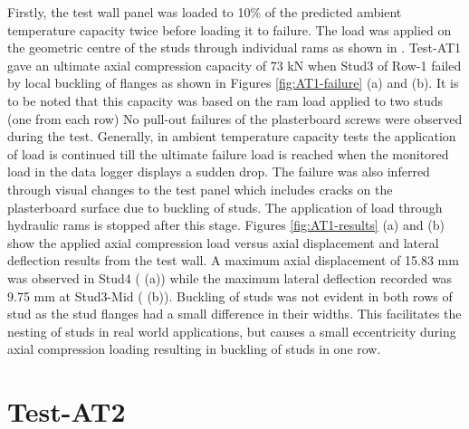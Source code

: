 Firstly, the test wall panel was loaded to 10\% of the predicted ambient temperature capacity twice before loading it to failure. The load was applied on the geometric centre of the studs through individual rams as shown in . Test-AT1 gave an ultimate axial compression capacity of 73 kN when Stud3 of Row-1 failed by local buckling of flanges as shown in Figures \ref{fig:AT1-failure} (a) and (b). It is to be noted that this capacity was based on the ram load applied to two studs (one from each row) No pull-out failures of the plasterboard screws were observed during the test. Generally, in ambient temperature capacity tests the application of load is continued till the ultimate failure load is reached when the monitored load in the data logger displays a sudden drop. The failure was also inferred through visual changes to the test panel which includes cracks on the plasterboard surface due to buckling of studs. The application of load through hydraulic rams is stopped after this stage. Figures \ref{fig:AT1-results} (a) and (b) show the applied axial compression load versus axial displacement and lateral deflection results from the test wall. A maximum axial displacement of 15.83 mm was observed in Stud4 ( (a)) while the maximum lateral deflection recorded was 9.75 mm at Stud3-Mid ( (b)). Buckling of studs was not evident in both rows of stud as the stud flanges had a small difference in their widths. This facilitates the nesting of studs in real world applications, but causes a small eccentricity during axial compression loading resulting in buckling of studs in one row. 

\section{Test-AT2}


